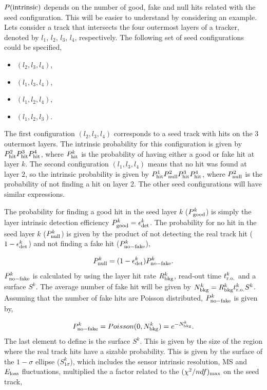 $P({\rm intrinsic})$ depends on the number of good, fake and null hits related with the seed configuration. This will be easier to understand by considering an example. 
Lets consider a track that intersects the four outermost layers of a tracker, denoted by $l_1$, $l_2$, $l_3$, $l_4$, respectively. The following set of seed configurations 
could be specified,

\begin{itemize}
 \item  $(l_2,l_3,l_4)$,
 \item  $(l_1,l_3,l_4)$,
 \item  $(l_1,l_2,l_4)$,
 \item  $(l_1,l_2,l_3)$.
\end{itemize}
\noindent
The first configuration $(l_2,l_3,l_4)$ corresponds to a seed track with hits on the 3 outermost layers. The intrinsic probability for this configuration is given by 
$P^2_{\rm hit} P^3_{\rm hit} P^4_{\rm hit}$, where $P^k_{\rm hit}$ is the probability of having either a good or fake hit at layer $k$. The second
configuration $(l_1,l_3,l_4)$ means that no hit was found at layer $2$, so the intrinsic probability is given by $P^1_{\rm hit} P^2_{\rm null} P^3_{\rm hit} P^4_{\rm hit}$, 
where $P^2_{\rm null}$ is the probability of not finding a hit on layer 2. The other seed configurations will have similar expressions.

The probability for finding a good hit in the seed layer $k$ ($P^k_{\rm good}$) is simply the layer intrinsic detection efficiency $P^k_{\rm good} = \epsilon^k_{\rm det}$. 
The probability for no hit in the seed layer $k$ ($P^k_{\rm null}$) is given by the product of not detecting the real track hit ($1 - \epsilon^k_{\rm det}$) and 
not finding a fake hit ($P^k_{\rm no-fake}$),

\begin{equation}
 P^k_{\rm null} = (1 - \epsilon^k_{\rm det}) P^k_{\rm no-fake}.
\end{equation}
\noindent
$P^k_{\rm no-fake}$ is calculated by using the layer hit rate $R^k_{\rm bkg}$, read-out time $t^k_{\rm r.o.}$ and a surface $S^k$. The average number of fake hit 
will be given by $N^k_{\rm bkg} = R^k_{\rm bkg} t^k_{\rm r.o.} S^k$. Assuming that the number of fake hits are Poisson distributed, $P^k_{\rm no-fake}$ is 
given by,

\begin{equation}
  P^k_{\rm no-fake} = Poisson(0,N^k_{\rm bkg}) = e^{-N^k_{\rm bkg}}.
\end{equation}
\noindent
The last element to define is the surface $S^k$. This is given by the size of the region where the real track hits have a sizable probability. This is given by the 
surface of the $1-\sigma$ ellipse ($S^k_{1\sigma}$), which includes the sensor intrinsic resolution, MS and $E_{\rm loss}$ fluctuations, multiplied the a factor related 
to the $(\chi^2/ndf)_{\rm max}$ on the seed track,


